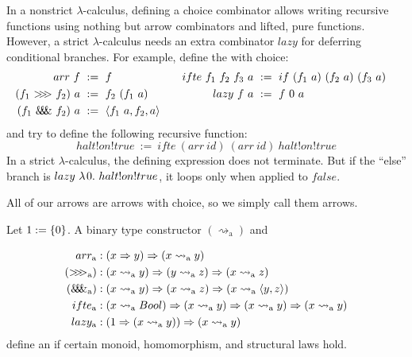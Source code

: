 \documentclass{llncs}
\newenvironment{displaybreaks}%
{%
	\begingroup%
	\allowdisplaybreaks%
}%
{%
	\endgroup%
	\ignorespacesafterend%
}
\newcommand{\arrow}{\rightsquigarrow}
\newcommand{\arrowarr}{\ensuremath{arr}}
\newcommand{\arrowcomp}{\ensuremath{{>}\mspace{-6mu}{>}\mspace{-6mu}{>}}}
\newcommand{\arrowpair}{\ensuremath{\mathit{\&\mspace{-7.5mu}\&\mspace{-7.5mu}\&}}}
\newcommand{\arrowif}{\ensuremath{ifte}}
\newcommand{\arrowlazy}{\ensuremath{lazy}}
\newcommand{\gen}{_\mathrm{a}}
\begin{document}
In a nonstrict $\lambda$-calculus, defining a choice combinator allows writing recursive functions using nothing but arrow combinators and lifted, pure functions.
However, a strict $\lambda$-calculus needs an extra combinator $\arrowlazy$ for deferring conditional branches.
For example, define the  with choice:
\begin{equation}
\begin{aligned}
	\begin{aligned}[t]
		\arrowarr~f &\ := \ f \\
		(f_1~\arrowcomp~f_2)~a &\ := \ f_2~(f_1~a) \\
		(f_1~\arrowpair~f_2)~a &\ := \ \pair{f_1~a,f_2,a} \\
	\end{aligned}
&\tab\tab
	\begin{aligned}[t]
		\arrowif~f_1~f_2~f_3~a &\ := \ if~(f_1~a)~(f_2~a)~(f_3~a) \\
		\arrowlazy~f~a &\ :=\ f~0~a
	\end{aligned}
\end{aligned}
\label{eqn:function-arrow}
\end{equation}
and try to define the following recursive function:
\begin{equation}
	halt!on!true \ := \ \arrowif~(\arrowarr~id)~(\arrowarr~id)~halt!on!true
\end{equation}
In a strict $\lambda$-calculus, the defining expression does not terminate.
But if the ``else'' branch is $\arrowlazy~\fun{0}{halt!on!true}$, it loops only when applied to $false$.

All of our arrows are arrows with choice, so we simply call them arrows.

\begin{definition}[arrow]Let $1 := \{{0}\}$. A binary type constructor $(\arrow\gen)$ and
\begin{displaybreaks}
\begin{equation}
\begin{aligned}
	\arrowarr\gen &: (x \tto y) \tto (x \arrow\gen y)
\nobreak\\
	(\arrowcomp\gen) &: (x \arrow\gen y) \tto (y \arrow\gen z) \tto (x \arrow\gen z)
\\
	(\arrowpair\gen) &: (x \arrow\gen y) \tto (x \arrow\gen z) \tto (x \arrow\gen \pair{y,z})
\\
	\arrowif\gen &: (x \arrow\gen Bool) \tto (x \arrow\gen y) \tto (x \arrow\gen y) \tto (x \arrow\gen y)
\nobreak\\
	\arrowlazy\gen &: (1 \tto (x \arrow\gen y)) \tto (x \arrow\gen y)
\label{eqn:arrow-combinators}
\end{aligned}
\end{equation}
\end{displaybreaks}
define an  if certain monoid, homomorphism, and structural laws hold.
\end{definition}
\end{document}
